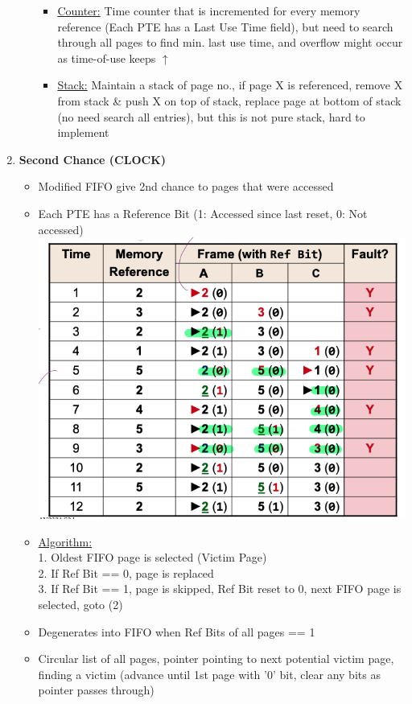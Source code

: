 \documentclass[landscape]{article}
\begin{document}
\begin{multicols*}{6}
\begin{enumerate}
\begin{itemize}
\begin{itemize}
            \item \underline{Counter:} Time counter that is incremented for every memory reference (Each PTE has a Last Use Time field), but need to search through all pages to find min. last use time, and overflow might occur as time-of-use keeps $\uparrow$
            \item \underline{Stack:} Maintain a stack of page no., if page X is referenced, remove X from stack \& push X on top of stack, replace page at bottom of stack (no need search all entries), but this is not pure stack, hard to implement
          \end{itemize}
      \end{itemize}
      \item \textbf{Second Chance (CLOCK)}
      \begin{itemize}
        \item Modified FIFO give 2nd chance to pages that were accessed
        \item Each PTE has a Reference Bit (1: Accessed since last reset, 0: Not accessed)
        \includegraphics[width=0.85\linewidth]{19_second_chance_algo.png}
        \item \underline{Algorithm:} \\
        1. Oldest FIFO page is selected (Victim Page)\\
        2. If Ref Bit == 0, page is replaced\\
        3. If Ref Bit  == 1, page is skipped, Ref Bit reset to 0, next FIFO page is selected, goto (2)
        \item Degenerates into FIFO when Ref Bits of all pages == 1
        \item {} Circular list of all pages, pointer pointing to next potential victim page, finding a victim (advance until 1st page with '0' bit, clear any bits as pointer passes through)
      \end{itemize}
    \end{enumerate}


\end{multicols*}
\end{document}
